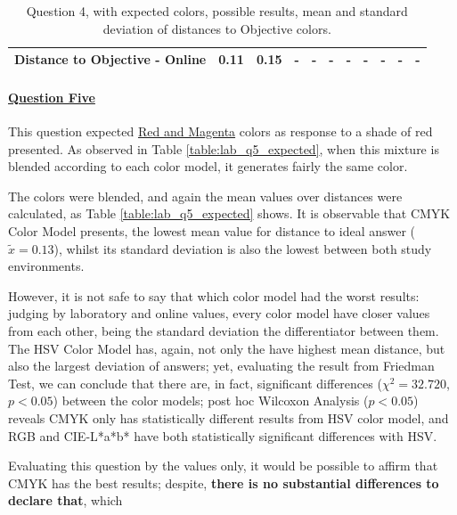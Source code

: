 \begin{table}[H]
{\begin{tabular}{lccccccccccccc}
    \multicolumn{4}{l}{Distance to Objective - Online}                                                                                               & \multicolumn{1}{|c}{0.11}       & \multicolumn{1}{c|}{0.15}    & \multicolumn{1}{|c}{-}       & \multicolumn{1}{c|}{-}    & \multicolumn{1}{|c}{-}         & \multicolumn{1}{c|}{-}    & \multicolumn{1}{|c}{-}        & \multicolumn{1}{c|}{-}    & \multicolumn{1}{|c}{-}       & \multicolumn{1}{c|}{-}    \\ \hline
    \end{tabular}}
  \caption[Question 4, with expected Results.]{Question 4, with expected colors, possible results, mean and standard deviation of distances to Objective colors.}
  \label{table:lab_q4_expected}
\end{table}
%
\paragraph{\ul{Question Five}}
%
This question expected \ul{Red and Magenta} colors as response to a shade of red presented. As observed in Table \ref{table:lab_q5_expected}, when this mixture is blended according
to each color model, it generates fairly the same color. \par
%
The colors were blended, and again the mean values over distances were calculated, as Table \ref{table:lab_q5_expected} shows. It is observable that CMYK Color Model presents,
the lowest mean value for distance to ideal answer ($\tilde{x} = 0.13$), whilst its standard deviation is also the lowest between both study environments. \par
%
However, it is not safe to say that which color model had the worst results: judging by laboratory and online values, every color model have closer values from each other, being the
standard deviation the differentiator between them. The HSV Color Model has, again, not only the have highest mean distance, but also the largest deviation of answers; yet, evaluating
the result from Friedman Test, we can conclude that there are, in fact, significant differences ($\chi^2 = 32.720$, $p < 0.05$) between the color models; post hoc Wilcoxon Analysis
($p < 0.05$) reveals CMYK only has statistically different results from HSV color model, and RGB and CIE-L*a*b* have both statistically significant differences with HSV. \par
%
Evaluating this question by the values only, it would be possible to affirm that CMYK has the best results; despite, \textbf{there is no substantial differences to declare that}, which
